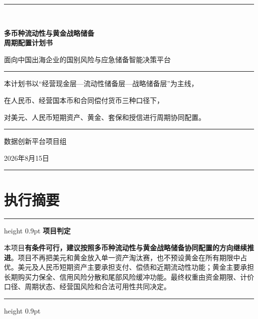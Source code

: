 \documentclass[UTF8,fontset=windows,12pt,openany]{ctexbook}
\newenvironment{decisionbox}[1][]{%
  \par\medskip\noindent\begin{center}\begin{minipage}{0.92\textwidth}%
  \color{OceanBlue}\hrule height 0.9pt\vspace{0.45em}%
  \textbf{#1}\par\smallskip\color{black}%
}{%
  \par\vspace{0.35em}\color{OceanBlue}\hrule height 0.9pt%
  \end{minipage}\end{center}\medskip%
}
\begin{document}
\begin{titlepage}
  \pagecolor{PaleBlue}
  \centering
  \vspace*{1.7cm}
  {\color{OceanBlue}\rule{0.86\textwidth}{1.4pt}}\\[1.0cm]
  {\Huge\bfseries\color{DeepNavy}多币种流动性与黄金战略储备\\[0.35cm]周期配置计划书\par}
  \vspace{0.8cm}
  {\LARGE\color{OceanBlue}面向中国出海企业的国别风险与应急储备智能决策平台\par}
  \vspace{1.0cm}
  \begin{minipage}{0.86\textwidth}
  \color{GoldLine}\rule{\textwidth}{0.9pt}\par\vspace{0.45cm}
  \color{black}
  \centering
  本计划书以“经营现金层—流动性储备层—战略储备层”为主线，\par
  在人民币、经营国本币和合同偿付货币三种口径下，\par
  对美元、人民币短期资产、黄金、套保和授信进行周期协同配置。
  \vspace{0.45cm}\par\color{GoldLine}\rule{\textwidth}{0.9pt}
  \end{minipage}
  \vfill
  {\large 数据创新平台项目组\par}
  \vspace{0.25cm}
  {\large 2026年8月15日\par}
  \vspace{0.75cm}
  {\color{OceanBlue}\rule{0.86\textwidth}{1.4pt}}
  \nopagecolor
\end{titlepage}

\frontmatter

\chapter*{执行摘要}

\begin{decisionbox}[项目判定]
本项目\textbf{有条件可行，建议按照多币种流动性与黄金战略储备协同配置的方向继续推进}。项目不再把美元和黄金放入单一资产淘汰赛，也不预设黄金在所有期限中占优。美元及人民币短期资产主要承担支付、偿债和近期流动性功能；黄金主要承担长期购买力保全、信用风险分散和尾部风险缓冲功能。最终权重由资金期限、计价口径、周期状态、经营国风险和合法可用性共同决定。
\end{decisionbox}
\end{document}
